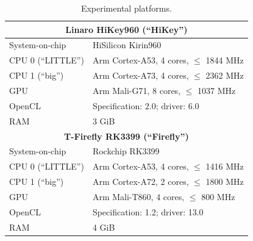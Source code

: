 \documentclass[sigplan]{acmart}
\begin{document}
\begin{table}[htbp]
\centering
  \begin{tabular}{ll}
  \toprule
  \multicolumn{2}{c}{{\bf Linaro HiKey960 (``HiKey'')}}\\
  \midrule
  System-on-chip      & HiSilicon Kirin960                      \\
  CPU 0 (``LITTLE'')  & Arm Cortex-A53, 4 cores, $\le$ 1844 MHz \\
  CPU 1 (``big'')     & Arm Cortex-A73, 4 cores, $\le$ 2362 MHz \\
  GPU                 & Arm Mali-G71,   8 cores, $\le$ 1037 MHz \\
  OpenCL              & Specification: 2.0; driver: 6.0         \\
  RAM                 & 3 GiB                                   \\
  \midrule
  \multicolumn{2}{c}{{\bf T-Firefly RK3399 (``Firefly'')}}\\
  \midrule
  System-on-chip      & Rockchip RK3399                         \\
  CPU 0 (``LITTLE'')  & Arm Cortex-A53, 4 cores, $\le$ 1416 MHz \\
  CPU 1 (``big'')     & Arm Cortex-A72, 2 cores, $\le$ 1800 MHz \\
  GPU                 & Arm Mali-T860,  4 cores, $\le$  800 MHz \\
  OpenCL              & Specification: 1.2; driver: 13.0        \\
  RAM                 & 4 GiB                                   \\
  \bottomrule
  \end{tabular}
\caption{\label{tab:platforms}Experimental platforms.}
\end{table}
\end{document}
